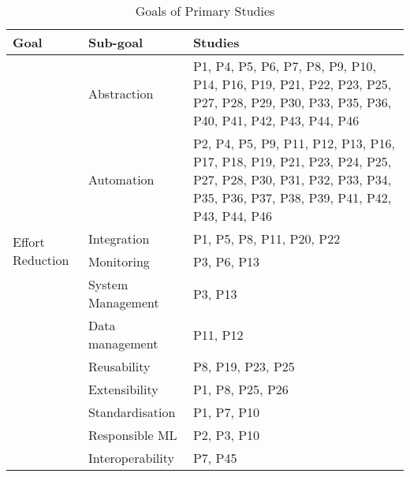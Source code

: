 \begin{table}[htbp]
\centering
\caption{Goals of Primary Studies}
    \label{table:goals}
    \footnotesize
        \begin{tabular}{p{3cm} p{3.5cm} p{8.5cm}}
        \hline
        \textbf{Goal} & \textbf{Sub-goal} & \textbf{Studies} \TBstrut \\
            \hline
            \multirow{10}{*}{Effort Reduction}  & \multicolumn{1}{p{2.5cm}}{Abstraction} & \multicolumn{1}{p{8.5cm}}{P1, P4, P5, P6, P7, P8, P9, P10, P14, P16, P19, P21, P22, P23, P25, P27, P28, P29, P30, P33, P35, P36, P40, P41, P42, P43, P44, P46} \TBstrut\\
                                                & \multicolumn{1}{p{2.5cm}}{Automation} & \multicolumn{1}{p{8.5cm}}{P2, P4, P5, P9, P11, P12, P13, P16, P17, P18, P19, P21, P23, P24, P25, P27, P28, P30, P31, P32, P33, P34, P35, P36, P37, P38, P39, P41, P42, P43, P44, P46} \TBstrut\\
                                                & \multicolumn{1}{p{2.5cm}}{Integration} & \multicolumn{1}{p{8.5cm}}{P1, P5, P8, P11, P20, P22} \TBstrut\\
                                                & \multicolumn{1}{p{2.5cm}}{Monitoring} & \multicolumn{1}{p{8.5cm}}{P3, P6, P13} \TBstrut\\
                                                & \multicolumn{1}{p{3.5cm}}{System Management} & \multicolumn{1}{p{8.5cm}}{P3, P13} \TBstrut\\
                                                & \multicolumn{1}{p{2.5cm}}{Data management} & \multicolumn{1}{p{8.5cm}}{P11, P12} \TBstrut\\

            \hline
            \multirow{9}{*}{Quality Improvement}  & \multicolumn{1}{p{2.5cm}}{Reusability} & \multicolumn{1}{p{8.5cm}}{P8, P19, P23, P25} \TBstrut\\&{Extensibility} & \multicolumn{1}{p{8.5cm}}{P1, P8, P25, P26} \TBstrut\\&
            {Standardisation} & \multicolumn{1}{p{8.5cm}}{P1, P7, P10} \TBstrut\\
                                                     & \multicolumn{1}{p{3.5cm}}{Responsible ML} & \multicolumn{1}{p{8.5cm}}{P2, P3, P10} \TBstrut\\
                                                     & \multicolumn{1}{p{2.5cm}}{Interoperability} & \multicolumn{1}{p{8.5cm}}{P7, P45} \TBstrut\\


\end{tabular}
\end{table}
